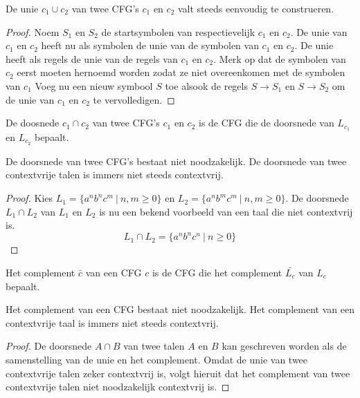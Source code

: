 \documentclass[main.tex]{subfiles}
\begin{document}
\begin{st}
  \label{st:unie-cfgs-bestaat-altijd}
  De unie $c_{1} \cup c_{2}$ van twee CFG's $c_{1}$ en $c_{2}$ valt steeds eenvoudig te construeren.
  
  \begin{proof}
    Noem $S_{1}$ en $S_{2}$ de startsymbolen van respectievelijk $c_{1}$ en $c_{2}$.
    De unie van $c_{1}$ en $c_{2}$ heeft nu als symbolen de unie van de symbolen van $c_{1}$ en $c_{2}$.
    De unie heeft als regels de unie van de regels van $c_{1}$ en $c_{2}$.
    Merk op dat de symbolen van $c_{2}$ eerst moeten hernoemd worden zodat ze niet overeenkomen met de symbolen van $c_{1}$
    Voeg nu een nieuw symbool $S$ toe alsook de regels $S\rightarrow S_{1}$ en $S\rightarrow S_{2}$ om de unie van $c_{1}$ en $c_{2}$ te vervolledigen.
  \end{proof}
\end{st}

\begin{de}
  De doosnede $c_{1} \cap c_{2}$ van twee CFG's $c_{1}$ en $c_{2}$ is de CFG die de doorsnede van $L_{c_{1}}$ en $L_{c_{2}}$ bepaalt.
\end{de}

\begin{tvb}
  \label{tvb:doorsnede-cfl-niet-altijd-cfl}
  De doorsnede van twee CFG's bestaat niet noodzakelijk.
  De doorsnede van twee contextvrije talen is immers niet steeds contextvrij.

  \begin{proof}
    Kies $L_{1} = \{ a^{n}b^{n}c^{m} \ |\ n,m \ge 0 \}$ en $L_{2} = \{ a^{n}b^{m}c^{m} \ |\ n,m \ge 0 \}$.
    De doorsnede $L_{1} \cap L_{2}$ van $L_{1}$ en $L_{2}$ is nu een bekend voorbeeld van een taal die niet contextvrij is.
    \[ L_{1} \cap L_{2} = \{ a^{n}b^{n}c^{n} \ |\ n \ge 0 \} \]
  \end{proof}
\end{tvb}

\begin{de}
  Het complement $\bar{c}$ van een CFG $c$ is de CFG die het complement $\bar{L_{c}}$ van $L_{c}$ bepaalt.
\end{de}

\begin{st}
  Het complement van een CFG bestaat niet noodzakelijk.
  Het complement van een contextvrije taal is immers niet steeds contextvrij.

  \begin{proof}
    De doorsnede $A \cap B$ van twee talen $A$ en $B$ kan geschreven worden als de samenstelling van de unie en het complement.
    Omdat de unie van twee contextvrije talen zeker contextvrij is, volgt hieruit dat het complement van twee contextvrije talen niet noodzakelijk contextvrij is.
  \end{proof}
\end{st}
\end{document}
